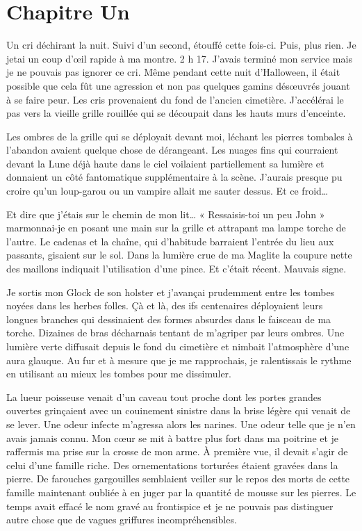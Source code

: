\chapter[Chapitre Un]{Chapitre Un}
Un cri déchirant la nuit. Suivi d'un second, étouffé cette fois-ci. Puis, plus rien. Je jetai un coup d'œil rapide à ma 
montre. 2 h 17. J'avais terminé mon service mais je ne pouvais pas ignorer ce cri. Même pendant cette nuit d'Halloween, 
il était possible que cela fût une agression et non pas quelques gamins désœuvrés jouant à se faire peur. Les cris 
provenaient du fond de l'ancien cimetière. J'accélérai le pas vers la vieille grille rouillée qui se découpait dans les 
hauts murs d'enceinte.

Les ombres de la grille qui se déployait devant moi, léchant les pierres tombales à l'abandon avaient quelque chose de 
dérangeant. Les nuages fins qui courraient devant la Lune déjà haute dans le ciel voilaient partiellement sa lumière et 
donnaient un côté fantomatique supplémentaire à la scène. J'aurais presque pu croire qu'un loup-garou ou un
vampire allait me sauter dessus. Et ce froid\ldots{}

Et dire que j'étais sur le chemin de mon lit\ldots{} « Ressaisis-toi un peu John » marmonnai-je en posant une main sur
la grille et attrapant ma lampe torche de l'autre. Le cadenas et la chaîne, qui d'habitude barraient l'entrée du 
lieu aux passants, gisaient sur le sol. Dans la lumière crue de ma Maglite la coupure nette des maillons indiquait 
l'utilisation d'une pince. Et c'était récent. Mauvais signe.

Je sortis mon Glock de son holster et j'avançai prudemment entre les tombes noyées dans les herbes folles. Çà et là, 
des ifs centenaires déployaient leurs longues branches qui dessinaient des formes absurdes dans le faisceau de ma 
torche. Dizaines de bras décharnais tentant de m'agriper par leurs ombres. Une lumière verte diffusait depuis le fond du cimetière et nimbait l'atmosphère d'une aura glauque. Au fur et à mesure que je me rapprochais, je ralentissais le rythme 
en utilisant au mieux les tombes pour me dissimuler.

La lueur poisseuse venait d'un caveau tout proche dont les portes grandes ouvertes grinçaient avec un couinement 
sinistre dans la brise légère qui venait de se lever. Une odeur infecte m'agressa alors les narines. Une odeur telle 
que je n'en avais jamais connu. Mon cœur se mit à battre plus fort dans ma poitrine et je raffermis ma prise sur la 
crosse de mon arme. À première vue, il devait s'agir de celui d'une famille riche. Des ornementations torturées 
étaient gravées dans la pierre. De farouches gargouilles semblaient veiller sur le repos des morts de cette famille 
maintenant oubliée à en juger par la quantité de mousse sur les pierres. Le temps avait effacé le nom gravé au 
frontispice et je ne pouvais pas distinguer autre chose que de vagues griffures incompréhensibles.

